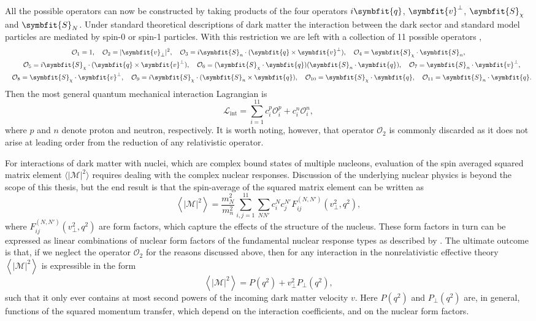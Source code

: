 \documentclass[b5paper, 10pt, twoside]{book}
\renewcommand{\vec}[1]{\symbfit{#1}}
\newcommand{\mean}[1]{\left\langle#1\right\rangle}
\newcommand{\tmean}[1]{\langle#1\rangle}
\begin{document}
All the possible operators can now be constructed by taking products of the four operators $i\vec{q}$, $\vec{v}^\perp$, $\vec{S}_\chi$ and $\vec{S}_N$. Under standard theoretical descriptions of dark matter the interaction between the dark sector and standard model particles are mediated by spin-0 or spin-1 particles. With this restriction we are left with a collection of 11 possible operators \parencite{FitzpatrickEtAl2013},
\begin{gather*}
    \mathcal{O}_1=1,\quad\mathcal{O}_2=|\vec{v}_\perp|^2,\quad\mathcal{O}_3=i\vec{S}_n\cdot(\vec{q}\times\vec{v}^\perp),\quad\mathcal{O}_4=\vec{S}_\chi\cdot\vec{S}_n,\\
    \quad\mathcal{O}_5=i\vec{S}_\chi\cdot(\vec{q}\times\vec{v}^\perp),\quad\mathcal{O}_6=(\vec{S}_\chi\cdot\vec{q})(\vec{S}_n\cdot\vec{q}),\quad\mathcal{O}_7=\vec{S}_n\cdot\vec{v}^\perp,\\
    \quad\mathcal{O}_8=\vec{S}_\chi\cdot\vec{v}^\perp,\quad\mathcal{O}_9=i\vec{S}_\chi\cdot(\vec{S}_n\times\vec{q}),\quad\mathcal{O}_{10}=\vec{S}_\chi\cdot\vec{q},\quad\mathcal{O}_{11}=\vec{S}_n\cdot\vec{q}.
\end{gather*}
Then the most general quantum mechanical interaction Lagrangian is
\begin{equation}
    \mathcal{L}_\text{int}=\sum_{i=1}^{11}c_i^p\mathcal{O}_i^p+c_i^n\mathcal{O}_i^n,
\end{equation}
where $p$ and $n$ denote proton and neutron, respectively. It is worth noting, however, that operator $\mathcal{O}_2$ is commonly discarded as it does not arise at leading order from the reduction of any relativistic operator.

For interactions of dark matter with nuclei, which are complex bound states of multiple nucleons, evaluation of the spin averaged squared matrix element $\tmean{|\mathcal{M}|^2}$ requires dealing with the complex nuclear responses. Discussion of the underlying nuclear physics is beyond the scope of this thesis, but the end result is that the spin-average of the squared matrix element can be written as
\begin{equation}
    \mean{|\mathcal{M}|^2}=\frac{m_N^2}{m_n^2}\sum_{i,j=1}^{11}\sum_{NN'}c_i^Nc_j^{N'}F_{ij}^{(N,N')}(v_\perp^2,q^2),
\end{equation}
where $F_{ij}^{(N,N')}(v_\perp^2,q^2)$ are form factors, which capture the effects of the structure of the nucleus. These form factors in turn can be expressed as linear combinations of nuclear form factors of the fundamental nuclear response types as described by \textcite{FitzpatrickEtAl2013}. The ultimate outcome is that, if we neglect the operator $\mathcal{O}_2$ for the reasons discussed above, then for any interaction in the nonrelativistic effective theory $\mean{|\mathcal{M}|^2}$ is expressible in the form
\begin{equation}
    \mean{|\mathcal{M}|^2}=P(q^2)+v_\perp^2P_\perp(q^2),
    \label{eq:eft-amplitude-square}
\end{equation}
such that it only ever contains at most second powers of the incoming dark matter velocity $v$. Here $P(q^2)$ and $P_\perp(q^2)$ are, in general, functions of the squared momentum transfer, which depend on the interaction coefficients, and on the nuclear form factors.
\end{document}
